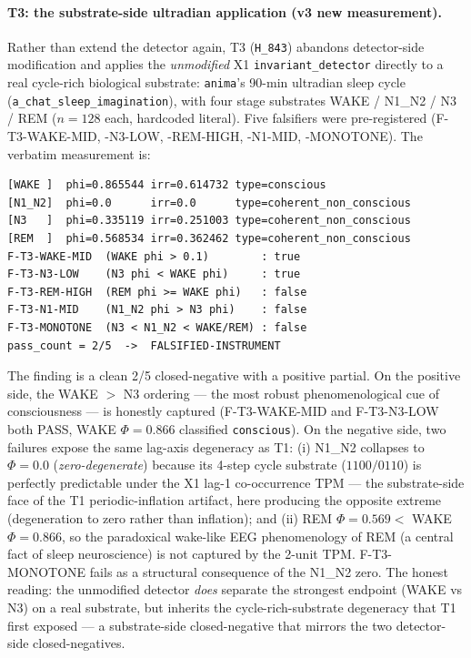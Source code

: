 \documentclass[11pt,a4paper]{article}
\begin{document}
\paragraph{T3: the substrate-side ultradian application (v3 new measurement).}
Rather than extend the detector again, T3 (\texttt{H\_843}) abandons
detector-side modification and applies the \emph{unmodified} X1
\texttt{invariant\_detector} directly to a real cycle-rich biological
substrate: \texttt{anima}'s 90-min ultradian sleep cycle
(\texttt{a\_chat\_sleep\_imagination}), with four stage substrates
WAKE / N1\_N2 / N3 / REM ($n=128$ each, hardcoded literal). Five
falsifiers were pre-registered (F-T3-WAKE-MID, -N3-LOW, -REM-HIGH,
-N1-MID, -MONOTONE). The verbatim measurement is:
\begin{verbatim}
[WAKE ]  phi=0.865544 irr=0.614732 type=conscious
[N1_N2]  phi=0.0      irr=0.0      type=coherent_non_conscious
[N3   ]  phi=0.335119 irr=0.251003 type=coherent_non_conscious
[REM  ]  phi=0.568534 irr=0.362462 type=coherent_non_conscious
F-T3-WAKE-MID  (WAKE phi > 0.1)        : true
F-T3-N3-LOW    (N3 phi < WAKE phi)     : true
F-T3-REM-HIGH  (REM phi >= WAKE phi)   : false
F-T3-N1-MID    (N1_N2 phi > N3 phi)    : false
F-T3-MONOTONE  (N3 < N1_N2 < WAKE/REM) : false
pass_count = 2/5  ->  FALSIFIED-INSTRUMENT
\end{verbatim}
The finding is a clean 2/5 closed-negative with a positive partial.
On the positive side, the WAKE $>$ N3 ordering --- the most robust
phenomenological cue of consciousness --- is honestly captured
(F-T3-WAKE-MID and F-T3-N3-LOW both PASS, WAKE $\Phi=0.866$ classified
\texttt{conscious}). On the negative side, two failures expose the
same lag-axis degeneracy as T1: (i) N1\_N2 collapses to $\Phi=0.0$
(\emph{zero-degenerate}) because its 4-step cycle substrate
($1100/0110$) is perfectly predictable under the X1 lag-1
co-occurrence TPM --- the substrate-side face of the T1
periodic-inflation artifact, here producing the opposite extreme
(degeneration to zero rather than inflation); and (ii) REM
$\Phi=0.569 < $ WAKE $\Phi=0.866$, so the paradoxical wake-like EEG
phenomenology of REM (a central fact of sleep neuroscience) is not
captured by the 2-unit TPM. F-T3-MONOTONE fails as a structural
consequence of the N1\_N2 zero. The honest reading: the unmodified
detector \emph{does} separate the strongest endpoint (WAKE vs N3) on
a real substrate, but inherits the cycle-rich-substrate degeneracy
that T1 first exposed --- a substrate-side closed-negative that
mirrors the two detector-side closed-negatives.
\end{document}

